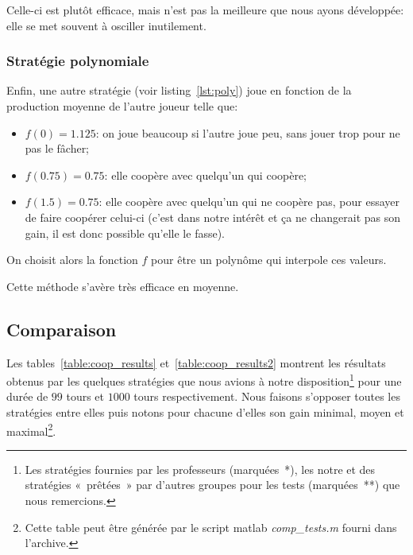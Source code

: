 \documentclass{scrartcl}
\begin{document}
      Celle-ci est plutôt efficace, mais n'est pas la meilleure que nous ayons
      développée: elle se met souvent à osciller inutilement.

    \subsubsection{Stratégie polynomiale} \label{sec:poly}
      Enfin, une autre stratégie (voir listing~\ref{lst:poly}) joue en fonction
      de la production moyenne de l'autre joueur telle que:
      \begin{itemize}
        \item $f(0) = 1.125$: on joue beaucoup si l'autre joue peu, sans jouer
          trop pour ne pas le fâcher;
        \item $f(0.75) = 0.75$: elle coopère avec quelqu'un qui coopère;
        \item $f(1.5) = 0.75$: elle coopère avec quelqu'un qui ne coopère pas,
          pour essayer de faire coopérer celui-ci (c'est dans notre intérêt et
          ça ne changerait pas son gain, il est donc possible qu'elle le
          fasse).
      \end{itemize}

      On choisit alors la fonction $f$ pour être un polynôme qui interpole ces
      valeurs.

      Cette méthode s'avère très efficace en moyenne.

  \subsection{Comparaison}
    Les tables~\ref{table:coop_results} et~\ref{table:coop_results2} montrent
    les résultats obtenus par les quelques stratégies que nous avions à notre
    disposition\footnote{Les stratégies fournies par les professeurs
    (marquées~*), les notre et des stratégies «~prêtées~» par d'autres
    groupes pour les tests (marquées~**) que nous remercions.} pour une durée
    de $99$ tours et $1000$ tours respectivement. Nous faisons s'opposer toutes
    les stratégies entre elles puis notons pour chacune d'elles son gain
    minimal, moyen et maximal\footnote{Cette table peut être générée par le
    script matlab \textit{comp\_tests.m} fourni dans l'archive.}.
\end{document}

